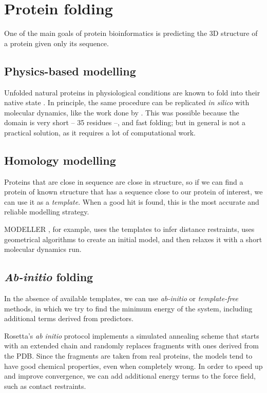 
\section{Protein folding}

One of the main goals of protein bioinformatics is predicting the 3D structure of a protein given only its sequence.

\subsection{Physics-based modelling}
Unfolded natural proteins in physiological conditions are known to fold into their native state \citep{fold_graciously}.
In principle, the same procedure can be replicated \emph{in silico} with molecular dynamics, like the work done by \citet{physics_folding}.
This was possible because the domain is very short -- 35 residues --, and fast folding; but in general is not a practical solution, as it requires a lot of computational work.

\subsection{Homology modelling}
Proteins that are close in sequence are close in structure, so if we can find a protein of known structure that has a sequence close to our protein of interest, we can use it as a \emph{template}.
When a good hit is found, this is the most accurate and reliable modelling strategy.

MODELLER \citep{modeller}, for example, uses the templates to infer distance restraints, uses geometrical algorithms to create an initial model, and then relaxes it with a short molecular dynamics run.


\subsection{\emph{Ab-initio} folding}
In the absence of available templates, we can use \emph{ab-initio} or \emph{template-free} methods, in which we try to find the minimum energy of the system, including additional terms derived from predictors.

Rosetta's \citep{Rosetta3}  \emph{ab initio} protocol implements a simulated annealing scheme that starts with an extended chain and randomly replaces fragments with ones derived from the PDB.
Since the fragments are taken from real proteins, the models tend to have good chemical properties, even when completely wrong.
In order to speed up and improve convergence, we can add additional energy terms to the force field, such as contact restraints.

